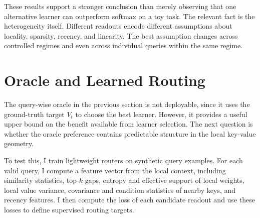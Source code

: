 \begin{table}[t]
\centering
\small
{}
\caption{Fraction of queries for which each learner attains the lowest MSE, averaged over five seeds and reported as percentages. The best readout varies both across task families and within each task.}\label{tab:synthetic_winner_fractions}
\end{table}

These results support a stronger conclusion than merely observing that one alternative learner can outperform softmax on a toy task. The relevant fact is the heterogeneity itself. Different readouts encode different assumptions about locality, sparsity, recency, and linearity. The best assumption changes across controlled regimes and even across individual queries within the same regime.

\section{Oracle and Learned Routing}\label{sec:oracle_and_learned_routing}

The query-wise oracle in the previous section is not deployable, since it uses the ground-truth target \(V_t\) to choose the best learner. However, it provides a useful upper bound on the benefit available from learner selection. The next question is whether the oracle preference contains predictable structure in the local key-value geometry.

To test this, I train lightweight routers on synthetic query examples. For each valid query, I compute a feature vector from the local context, including similarity statistics, top-\(k\) gaps, entropy and effective support of local weights, local value variance, covariance and condition statistics of nearby keys, and recency features. I then compute the loss of each candidate readout and use these losses to define supervised routing targets.

